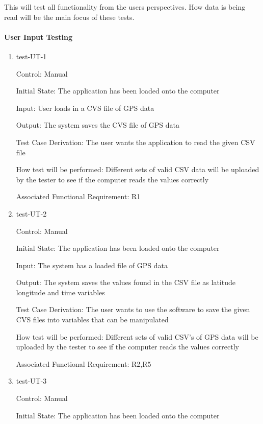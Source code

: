 \documentclass[12pt, titlepage]{article}
\begin{document}
This will test all functionality from the users perspectives. How data is being read will be the main focus of these tests. 
		
\paragraph{User Input Testing}

\begin{enumerate}

\item{test-UT-1\\}

Control: Manual 
					
Initial State: The application has been loaded onto the computer
					
Input: User loads in a CVS file of GPS data
					
Output: The system saves the CVS file of GPS data

Test Case Derivation: The user wants the application to read the given CSV file 
					
How test will be performed: Different sets of valid CSV data will be uploaded by the tester to see if the computer reads the values correctly

Associated Functional Requirement: R1 

\item{test-UT-2\\}

Control: Manual 
					
Initial State: The application has been loaded onto the computer
					
Input: The system has a loaded file of GPS data 
					
Output: The system saves the values found in the CSV file as latitude longitude and time variables

Test Case Derivation: The user wants to use the software to save the given CVS files into variables that can be manipulated
					
How test will be performed: Different sets of valid CSV's of GPS data will be uploaded by the tester to see if the computer reads the values correctly

Associated Functional Requirement: R2,R5

\item{test-UT-3\\}

Control: Manual 
					
Initial State: The application has been loaded onto the computer
					

\end{enumerate}
\end{document}
